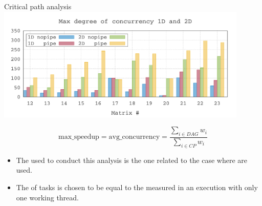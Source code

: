 \begin{frame}{Critical path analysis}
  \centering
  \includegraphics[width=0.9\textwidth]{data/cp_ada_toms_2d}

  \begin{displaymath}
    \text{max\_speedup}=\text{avg\_concurrency} = \frac{\sum_{i \in DAG}
      w_i}{\sum_{i \in CP} w_i}
  \end{displaymath}

  \begin{itemize}
  \item The  used to conduct this analysis is the one related
    to the case where  are used.
  \item The  of tasks is chosen to be equal to the
     measured in an execution with only one working
    thread.
  \end{itemize}

\end{frame}
